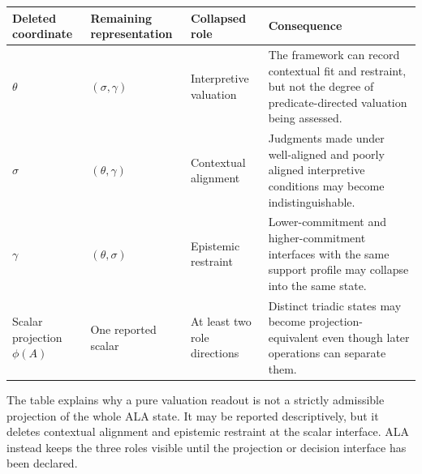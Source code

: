\documentclass[reqno,final]{amsart}
\theoremstyle{definition}
\theoremstyle{plain}
\theoremstyle{remark}
\begin{document}
\begin{center}
\captionsetup{type=table,hypcap=false}
\caption{Coordinate deletion and role collapse.}
\label{tab:app-coordinate-deletion}
\fontsize{9}{10.8}\selectfont
\renewcommand{\arraystretch}{1.0}
\setlength{\tabcolsep}{4pt}
\begin{tabular}{>{\raggedright\arraybackslash}p{2.3cm}>{\raggedright\arraybackslash}p{2.7cm}>{\raggedright\arraybackslash}p{3.0cm}>{\raggedright\arraybackslash}p{6.0cm}}
\hline
\textbf{Deleted coordinate} &
\textbf{Remaining representation} &
\textbf{Collapsed role} &
\textbf{Consequence} \\
\hline
\(\theta\) & \((\sigma,\gamma)\) & Interpretive valuation & The framework can record contextual fit and restraint, but not the degree of predicate-directed valuation being assessed. \\
\(\sigma\) & \((\theta,\gamma)\) & Contextual alignment & Judgments made under well-aligned and poorly aligned interpretive conditions may become indistinguishable. \\
\(\gamma\) & \((\theta,\sigma)\) & Epistemic restraint & Lower-commitment and higher-commitment interfaces with the same support profile may collapse into the same state. \\
Scalar projection \(\phi(A)\) & One reported scalar & At least two role directions & Distinct triadic states may become projection-equivalent even though later operations can separate them. \\
\hline
\end{tabular}
\end{center}

The table explains why a pure valuation readout is not a strictly admissible projection of the whole ALA state. It may be reported descriptively, but it deletes contextual alignment and epistemic restraint at the scalar interface. ALA instead keeps the three roles visible until the projection or decision interface has been declared.
\end{document}
